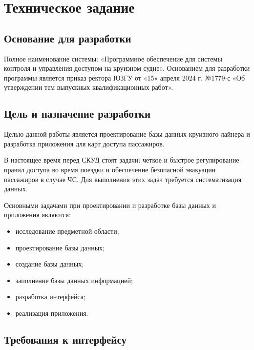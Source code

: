 \section{Техническое задание}
\subsection{Основание для разработки}

Полное наименование системы: «Программное обеспечение для системы контроля и управления доступом на круизном судне».
Основанием для разработки программы является приказ ректора ЮЗГУ от «15» апреля 2024 г. №1779-с «Об утверждении тем выпускных квалификационных работ».

\subsection{Цель и назначение разработки}

Целью данной работы является проектирование базы данных круизного лайнера и разработка приложения для карт доступа пассажиров.

В настоящее время перед СКУД стоят задачи: четкое и быстрое регулирование правил доступа во время поездки и обеспечение безопасной эвакуации пассажиров в случае ЧС. Для выполнения этих задач требуется систематизация данных. 

Основными задачами при проектировании и разработке базы данных  и приложения являются:
\begin{itemize}
	\item исследование предметной области;
	\item проектирование базы данных;
	\item создание базы данных;
	\item заполнение базы данных информацией;
	\item разработка  интерфейса;
	\item реализация приложения.
\end{itemize}

\subsection{Требования к интерфейсу}

